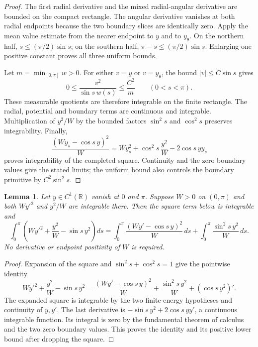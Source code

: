\documentclass[11pt]{article}
\newtheorem{lemma}[theorem]{Lemma}
\newcommand{\R}{\mathbb R}
\begin{document}
\begin{proof}
The first radial derivative and the mixed radial-angular derivative are
bounded on the compact rectangle. The angular derivative vanishes at both
radial endpoints because the two boundary slices are identically zero.
Apply the mean value estimate from the nearer endpoint to $y$ and to
$y_\theta$. On the northern half, $s\leq(\pi/2)\sin s$; on the southern half,
$\pi-s\leq(\pi/2)\sin s$. Enlarging one positive constant proves all three
uniform bounds.

Let $m=\min_{[0,\pi]}w>0$. For either $v=y$ or $v=y_\theta$, the bound
$|v|\leq C\sin s$ gives
\[
 0\leq\frac{v^2}{\sin s\,w(s)}\leq\frac{C^2}{m}
 \qquad(0<s<\pi).
\]
These measurable quotients are therefore integrable on the finite rectangle.
The radial, potential and boundary terms are continuous and integrable.
Multiplication of $y^2/W$ by the bounded factors $\sin^2s$ and $\cos^2s$
preserves integrability. Finally,
\[
 \frac{(Wy_s-\cos s\,y)^2}{W}
     =Wy_s^2+\cos^2s\,\frac{y^2}{W}-2\cos s\,yy_s
\]
proves integrability of the completed square. Continuity and the zero boundary
values give the stated limits; the uniform bound also controls the boundary
primitive by $C^2\sin^2s$.
\end{proof}

\begin{lemma}\label{lem:polar-square-completion}
Let $y\in C^1(\R)$ vanish at $0$ and $\pi$. Suppose $W>0$ on $(0,\pi)$ and
both $Wy'^2$ and $y^2/W$ are integrable there. Then the square term below is
integrable and
\begin{equation}\label{eq:polar-square-completion}
 \int_0^\pi\left(Wy'^2+\frac{y^2}{W}-\sin s\,y^2\right)ds
 =\int_0^\pi\frac{(Wy'-\cos s\,y)^2}{W}\,ds
   +\int_0^\pi\frac{\sin^2s\,y^2}{W}\,ds.
\end{equation}
No derivative or endpoint positivity of $W$ is required.
\end{lemma}

\begin{proof}
Expansion of the square and $\sin^2s+\cos^2s=1$ give the pointwise identity
\[
 Wy'^2+\frac{y^2}{W}-\sin s\,y^2
 =\frac{(Wy'-\cos s\,y)^2}{W}
   +\frac{\sin^2s\,y^2}{W}+(\cos s\,y^2)'.
\]
The expanded square is integrable by the two finite-energy hypotheses and
continuity of $y,y'$. The last derivative is
$-\sin s\,y^2+2\cos s\,yy'$, a continuous integrable function.
Its integral is zero by the fundamental theorem of calculus and the two zero
boundary values. This proves the identity and its positive lower bound after
dropping the square.
\end{proof}
\end{document}
